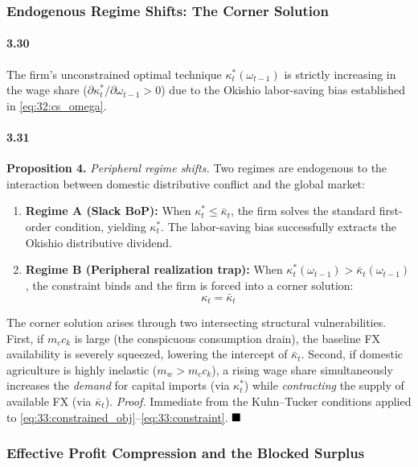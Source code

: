 \subsubsection{Endogenous Regime Shifts: The Corner Solution}

\paragraph{3.30}
The firm's unconstrained optimal technique
$\kappa_t^*(\omega_{t-1})$ is strictly increasing in the wage
share ($\partial \kappa_t^* / \partial \omega_{t-1} > 0$) due
to the Okishio labor-saving bias established in
\eqref{eq:32:cs_omega}.

\paragraph{3.31}
\textbf{Proposition 4.} \textit{Peripheral regime shifts.}
Two regimes are endogenous to the interaction between domestic
distributive conflict and the global market:
\begin{enumerate}
	\item \textbf{Regime A (Slack BoP):} When
	$\kappa_t^* \le \bar{\kappa}_t$, the firm solves the
	standard first-order condition, yielding $\kappa_t^*$. The
	labor-saving bias successfully extracts the Okishio
	distributive dividend.
	\item \textbf{Regime B (Peripheral realization trap):} When
	$\kappa_t^*(\omega_{t-1}) > \bar{\kappa}_t(\omega_{t-1})$,
	the constraint binds and the firm is forced into a corner
	solution:
	\begin{equation}
		\kappa_t = \bar{\kappa}_t
		\label{eq:33:corner}
	\end{equation}
\end{enumerate}
The corner solution arises through two intersecting structural
vulnerabilities. First, if $m_c c_k$ is large (the
conspicuous consumption drain), the baseline FX availability
is severely squeezed, lowering the intercept of
$\bar{\kappa}_t$. Second, if domestic agriculture is highly
inelastic ($m_w > m_c c_k$), a rising wage share
simultaneously increases the \textit{demand} for capital
imports (via $\kappa_t^*$) while \textit{contracting} the
supply of available FX (via $\bar{\kappa}_t$).
\textit{Proof.} Immediate from the Kuhn--Tucker conditions
applied to \eqref{eq:33:constrained_obj}--\eqref{eq:33:constraint}.
$\hfill\blacksquare$

\subsubsection{Effective Profit Compression and the Blocked
	Surplus}

